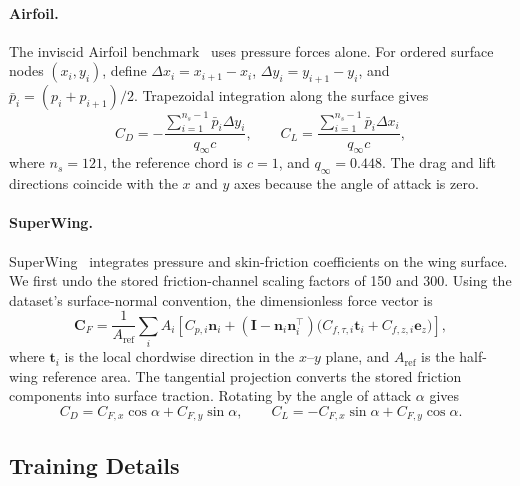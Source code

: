 \paragraph{Airfoil.}
The inviscid Airfoil benchmark~\citep{li2023geofno} uses pressure forces alone. For ordered surface nodes $(x_i,y_i)$, define $\Delta x_i=x_{i+1}-x_i$, $\Delta y_i=y_{i+1}-y_i$, and $\bar p_i=(p_i+p_{i+1})/2$. Trapezoidal integration along the surface gives
\begin{equation}
    C_D=-\frac{\sum_{i=1}^{n_s-1}\bar p_i\Delta y_i}{q_\infty c},
    \qquad
    C_L=\frac{\sum_{i=1}^{n_s-1}\bar p_i\Delta x_i}{q_\infty c},
    \label{eq:app_airfoil_coefficients}
\end{equation}
where $n_s=121$, the reference chord is $c=1$, and $q_\infty=0.448$. The drag and lift directions coincide with the $x$ and $y$ axes because the angle of attack is zero.

\paragraph{SuperWing.}
SuperWing~\citep{yang2025superwing} integrates pressure and skin-friction coefficients on the wing surface. We first undo the stored friction-channel scaling factors of 150 and 300. Using the dataset's surface-normal convention, the dimensionless force vector is
\begin{equation}
    \mathbf{C}_F
    =\frac{1}{A_{\mathrm{ref}}}\sum_i A_i
    \left[
        C_{p,i}\mathbf{n}_i
        +(\mathbf{I}-\mathbf{n}_i\mathbf{n}_i^{\top})
        \bigl(C_{f,\tau,i}\mathbf{t}_i+C_{f,z,i}\mathbf{e}_z\bigr)
    \right],
    \label{eq:app_superwing_force}
\end{equation}
where $\mathbf{t}_i$ is the local chordwise direction in the $x$--$y$ plane, and $A_{\mathrm{ref}}$ is the half-wing reference area. The tangential projection converts the stored friction components into surface traction. Rotating by the angle of attack $\alpha$ gives
\begin{equation}
    C_D=C_{F,x}\cos\alpha+C_{F,y}\sin\alpha,
    \qquad
    C_L=-C_{F,x}\sin\alpha+C_{F,y}\cos\alpha.
    \label{eq:app_superwing_coefficients}
\end{equation}

\clearpage
\subsection{Training Details}
\label{app:training_details}

